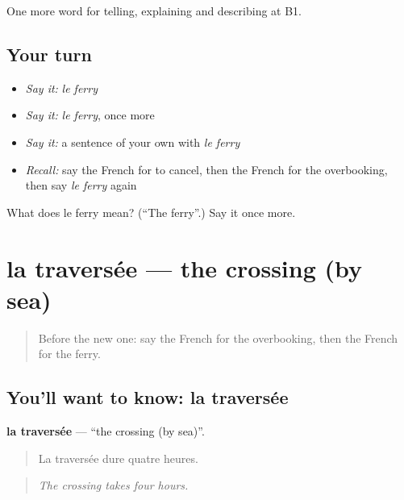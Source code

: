 \begin{grammarlens}[title={What you've built}]
One more word for telling, explaining and describing at B1.
\end{grammarlens}

\subsection*{Your turn}
\begin{itemize}
\raggedright
  \item \emph{Say it:} \emph{le ferry}
  \item \emph{Say it:} \emph{le ferry}, once more
  \item \emph{Say it:} a sentence of your own with \emph{le ferry}
  \item \emph{Recall:} say the French for to cancel, then the French for the overbooking, then say \emph{le ferry} again
\end{itemize}

\begin{tcolorbox}[breakable,colback=teal!4,colframe=teal!35!black,title={Before you move on}]
What does le ferry mean? (\textquotedblleft{}The ferry\textquotedblright{}.) Say it once more.
\end{tcolorbox}
\section[la traversée]{la traversée — the crossing (by sea)}

\label{lesson:FR-C422-traversee}



\begin{quote}
Before the new one: say the French for the overbooking, then the French for the ferry.
\end{quote}

\subsection*{You'll want to know: la traversée}
\textbf{la traversée} — \textquotedblleft{}the crossing (by sea)\textquotedblright{}.

\begin{quote}
La traversée dure quatre heures.
\end{quote}

\begin{quote}
\emph{The crossing takes four hours.}
\end{quote}

